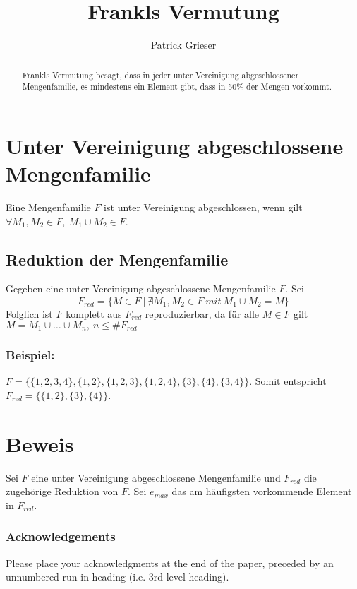 \documentclass[runningheads]{llncs}
\begin{document}
%
\title{Frankls Vermutung}
%
%
\author{Patrick Grieser}
%
\maketitle              %
%
\begin{abstract}
Frankls Vermutung besagt, dass in jeder unter Vereinigung abgeschlossener Mengenfamilie, es mindestens ein Element gibt, dass in 50\% der Mengen vorkommt.
\end{abstract}
%
%
%
\section{Unter Vereinigung abgeschlossene Mengenfamilie}
Eine Mengenfamilie $F$ ist unter Vereinigung abgeschlossen, wenn gilt $\forall M_{1},M_{2} \in F,\ M_{1}\cup M_{2} \in F$.
\subsection{Reduktion der Mengenfamilie}
Gegeben eine unter Vereinigung abgeschlossene Mengenfamilie $F$. Sei $$F_{red} = \{M \in F\ |\ \nexists M_{1},M_{2} \in F\ mit\ M_{1} \cup M_{2} = M\}$$ 
Folglich ist $F$ komplett aus $F_{red}$ reproduzierbar, da für alle $M \in F$ gilt $M = M_{1} \cup \dots \cup M_{n},\ n \leq \# F_{red}$ 
\subsubsection{Beispiel:}
$F = \{\{1, 2, 3, 4\},\{1,2\},\{1,2,3\},\{1,2,4\},\{3\},\{4\},\{3,4\}\}$. Somit entspricht $F_{red} = \{\{1,2\},\{3\},\{4\}\}$.
\section{Beweis}
Sei $F$ eine unter Vereinigung abgeschlossene Mengenfamilie und $F_{red}$ die zugehörige Reduktion von $F$. Sei $e_{max}$ das am häufigsten vorkommende Element in $F_{red}$.
 


\subsubsection{Acknowledgements} Please place your acknowledgments at
the end of the paper, preceded by an unnumbered run-in heading (i.e.
3rd-level heading).
\end{document}
